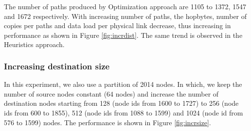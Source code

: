 The number of paths produced by Optimization approach are 1105 to 1372, 1547 and 1672 respectively. With increasing number of paths, the hopbytes, number of copies per paths and data load per physical link decrease, thus increasing in performance as shown in Figure \ref{fig:incrdist}. The same trend is observed in the Heuristics approach.

\subsubsection{Increasing destination size}

In this experiment, we also use a partition of 2014 nodes. In which, we keep the number of source nodes constant (64 nodes) and increase the number of destination nodes starting from 128 (node ids from 1600 to 1727) to 256 (node ids from 600 to 1855), 512 (node ids from 1088 to 1599) and 1024 (node id from 576 to 1599) nodes. The performance is shown in Figure \ref{fig:incrsize}.

